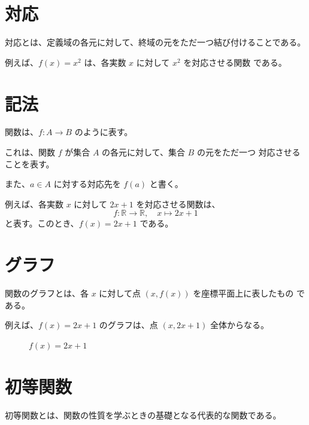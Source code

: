 \documentclass[11pt]{ltjsreport}
\begin{document}
\section{対応}

対応とは、定義域の各元に対して、終域の元をただ一つ結び付けることである。

例えば、\( f(x) = x^2 \) は、各実数 \( x \) に対して \( x^2 \) を対応させる関数
である。

\section{記法}

関数は、\( f : A \to B \) のように表す。

これは、関数 \( f \) が集合 \( A \) の各元に対して、集合 \( B \) の元をただ一つ
対応させることを表す。

また、\( a \in A \) に対する対応先を \( f(a) \) と書く。

例えば、各実数 \( x \) に対して \( 2x + 1 \) を対応させる関数は、
\[
   f : \mathbb{R} \to \mathbb{R}, \quad x \mapsto 2x + 1
\]
と表す。このとき、\( f(x) = 2x + 1 \) である。

\section{グラフ}

関数のグラフとは、各 \( x \) に対して点 \( (x, f(x)) \) を座標平面上に表したもの
である。

例えば、\( f(x) = 2x + 1 \) のグラフは、点 \( (x, 2x + 1) \) 全体からなる。

\begin{figure}[h]
   \centering
   \caption{\( f(x) = 2x + 1 \)}
\end{figure}

\section{初等関数}

初等関数とは、関数の性質を学ぶときの基礎となる代表的な関数である。
\end{document}
